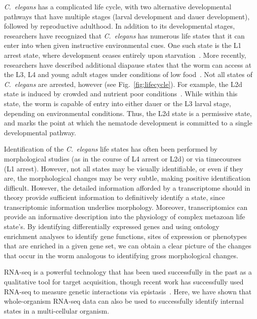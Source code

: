 \documentclass[9pt,twocolumn,twoside]{gsag3jnl}
\newcommand{\cel}{\emph{C.~elegans}}
\begin{document}
\cel{} has a complicated life cycle, with two alternative developmental pathways
that have multiple stages (larval development and dauer development), followed
by reproductive adulthood. In addition to its developmental stages, researchers
have recognized that \cel{} has numerous life states that it can enter into when
given instructive environmental cues. One such state is the L1 arrest state,
where development ceases entirely upon starvation~\citep{Johnson1984}. More
recently, researchers have described additional diapause states that the worm
can access at the L3, L4 and young adult stages under conditions of low
food~\citep{Angelo2009,Seidel2011,Schindler2014}. Not all states of \cel{} are
arrested, however (see Fig.~\ref{fig:lifecycle}). For example, the L2d state is
induced by crowded and nutrient poor conditions~\citep{Golden1984}. While within
this state, the worm is capable of entry into either dauer or the L3 larval
stage, depending on environmental conditions. Thus, the L2d state is a
permissive state, and marks the point at which the nematode development is
committed to a single developmental pathway.

Identification of the \cel{} life states has often been performed by
morphological studies (as in the course of L4 arrest or L2d) or via timecourses
(L1 arrest). However, not all states may be visually identifiable, or even if
they are, the morphological changes may be very subtle, making positive
identification difficult. However, the detailed information afforded by a
transcriptome should in theory provide sufficient information to definitively
identify a state, since transcriptomic information underlies morphology.
Moreover, transcriptomics can provide an informative description into the
physiology of complex metazoan life state's. By identifying differentially
expressed genes and using ontology enrichment analyses to identify gene
functions, sites of expression or phenotypes that are enriched in a given gene
set, we can obtain a clear picture of the changes that occur in the worm
analogous to identifying gross morphological changes.

RNA-seq is a powerful technology that has been used successfully in the past as
a qualitative tool for target acquisition, though recent work has successfully
used RNA-seq to measure genetic interactions via
epistasis~\citep{Dixit2016,Angeles-Albores2017}. Here, we have shown that
whole-organism RNA-seq data can also be used to successfully identify internal
states in a multi-cellular organism.
\end{document}
